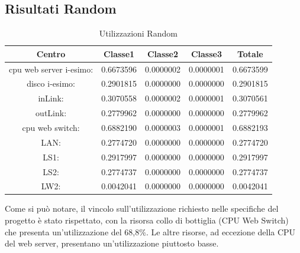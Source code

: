 \subsection{Risultati Random}
\begin{table}[H]
\begin{center}
\begin{tabular}{||c|c|c|c|c||}
\hline
Centro &Classe1 &Classe2 &Classe3 &Totale\\
\hline
\hline
 cpu web server i-esimo: 	&0.6673596	&0.0000002	&0.0000001	&0.6673599\\
\hline
 disco i-esimo: 	&0.2901815	&0.0000000	&0.0000000	&0.2901815\\
\hline
 inLink: 	&0.3070558	&0.0000002	&0.0000001	&0.3070561\\
\hline
 outLink: 	&0.2779962	&0.0000000	&0.0000000	&0.2779962\\
\hline
 cpu web switch: 	&0.6882190	&0.0000003	&0.0000001	&0.6882193\\
\hline
 LAN: 	&0.2774720	&0.0000000	&0.0000000	&0.2774720\\
\hline
 LS1: 	&0.2917997	&0.0000000	&0.0000000	&0.2917997\\
\hline
 LS2:	&0.2774737	&0.0000000	&0.0000000	&0.2774737\\
\hline
 LW2: 	&0.0042041	&0.0000000	&0.0000000	&0.0042041\\
\hline
\end{tabular}
\end{center}
\caption{Utilizzazioni Random}
\label{risrandom}
\end{table}
Come si può notare, il vincolo sull'utilizzazione richiesto nelle specifiche del progetto è stato rispettato, con la risorsa collo di bottiglia (CPU Web Switch) che presenta un'utilizzazione del 68,8\%. Le altre risorse, ad eccezione della CPU del web server, presentano un'utilizzazione piuttosto basse.


